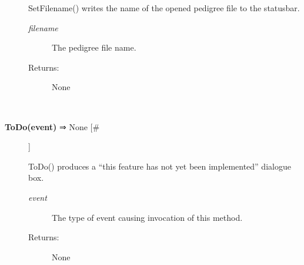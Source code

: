 \begin{description}
 SetFilename() writes the name of the opened pedigree file to the statusbar.
\begin{description}
\item[\emph{filename}
] The pedigree file name.
\item[Returns:] None

\end{description}
\\ 

\item[\textbf{ToDo(event)}
 ⇒ None [\#]]

 ToDo() produces a ``this feature has not yet been implemented'' dialogue box.
\begin{description}
\item[\emph{event}
] The type of event causing invocation of this method.
\item[Returns:] None

\end{description}
\\ 


\end{description}


